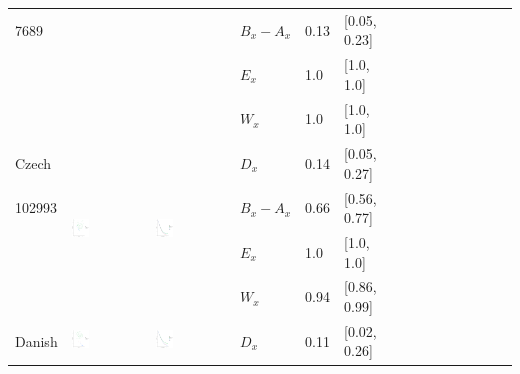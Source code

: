 \documentclass[11pt,letterpaper]{article}
\begin{document}
\begin{longtable}{lllllllllllllll}
7689  &    &    &  $B_x-A_x$  &  0.13  &  [0.05, 0.23]  \\ 
  &    &    &  $E_x$  &  1.0  &  [1.0, 1.0]  \\ 
  &    &    &  $W_x$  &  1.0  &  [1.0, 1.0]  \\ [10.25ex] \hline
Czech  &  \multirow{4}{*}{\includegraphics[width=0.25\textwidth]{figures/Czech-entropy-memory.pdf}}  &  \multirow{4}{*}{\includegraphics[width=0.25\textwidth]{figures/Czech-listener-surprisal-memory.pdf}}  &  $D_x$  &  0.14  &  [0.05, 0.27]  \\ 
102993  &    &    &  $B_x-A_x$  &  0.66  &  [0.56, 0.77]  \\ 
  &    &    &  $E_x$  &  1.0  &  [1.0, 1.0]  \\ 
  &    &    &  $W_x$  &  0.94  &  [0.86, 0.99]  \\ [10.25ex] \hline
Danish  &  \multirow{4}{*}{\includegraphics[width=0.25\textwidth]{figures/Danish-entropy-memory.pdf}}  &  \multirow{4}{*}{\includegraphics[width=0.25\textwidth]{figures/Danish-listener-surprisal-memory.pdf}}  &  $D_x$  &  0.11  &  [0.02, 0.26]  \\ 

\end{longtable}
\end{document}
